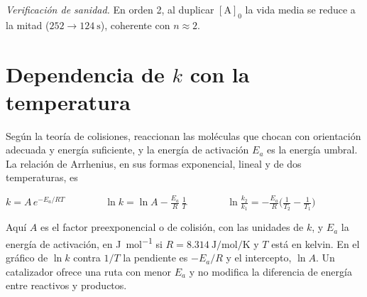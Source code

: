 \documentclass[10pt,letterpaper]{article}
\begin{document}
\vspace{2pt}
{\small\textit{Verificación de sanidad.} En orden 2, al duplicar $[\mathrm{A}]_0$ la vida media se reduce a la mitad ($252\to\SI{124}{\second}$), coherente con $n\approx2$.}

\section{Dependencia de $k$ con la temperatura}
Según la teoría de colisiones, reaccionan las moléculas que chocan con orientación adecuada y energía suficiente, y la energía de activación $E_a$ es la energía umbral. La relación de Arrhenius, en sus formas exponencial, lineal y de dos temperaturas, es
\begin{clave}
$\displaystyle k=A\,e^{-E_a/RT}\qquad\qquad \ln k=\ln A-\frac{E_a}{R}\,\frac{1}{T}\qquad\qquad \ln\frac{k_2}{k_1}=-\frac{E_a}{R}\Big(\frac{1}{T_2}-\frac{1}{T_1}\Big)$
\end{clave}
Aquí $A$ es el factor preexponencial o de colisión, con las unidades de $k$, y $E_a$ la energía de activación, en \si{\joule\per\mole} si $R=\SI{8,314}{\joule\per\mole\per\kelvin}$ y $T$ está en kelvin. En el gráfico de $\ln k$ contra $1/T$ la pendiente es $-E_a/R$ y el intercepto, $\ln A$. Un catalizador ofrece una ruta con menor $E_a$ y no modifica la diferencia de energía entre reactivos y productos.
\end{document}
